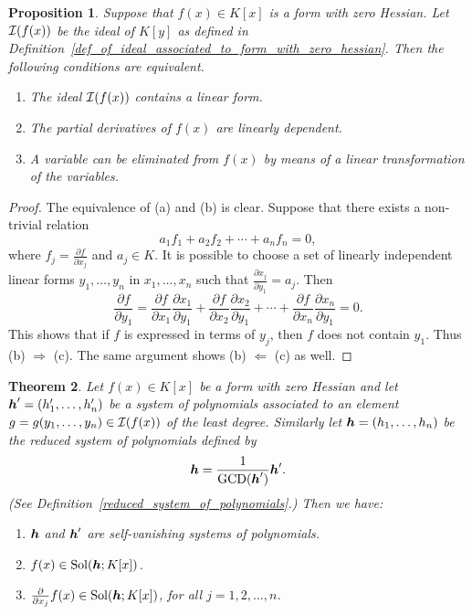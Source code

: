 \documentclass[12pt]{article}
\newtheorem{theorem}{Theorem}[section]
\newtheorem{proposition}[theorem]{Proposition}
\theoremstyle{definition}
\theoremstyle{remark}
\def\cI{{\cal I}}
\def\sol{{\rm Sol}}
\def\boldh{\mbox{\boldmath $h$}}
\def\pa{\partial}
\begin{document}
\begin{proposition} \label{basic_3}   %
Suppose that 
$f(x) \in K[x]$ is a form with zero Hessian. 
Let ${\cal I}(f(x))$ be the ideal of 
$K[y]$ as  defined in Definition~\ref{def_of_ideal_associated_to_form_with_zero_hessian}.  
Then the following conditions are equivalent. 
\begin{enumerate}
\item[{\rm (a)}]
The ideal ${\cal I}(f(x))$ contains a linear form. 
\item[${\rm (b)}$]
The partial derivatives of $f(x)$ are linearly dependent. 
\item[{\rm (c)}]
A variable can be eliminated from  $f(x)$ by means of a linear transformation of the variables. 
\end{enumerate}
\end{proposition}    

\begin{proof}
The equivalence of (a) and (b) is clear.  Suppose that there exists a non-trivial relation 
\[a_1 f_1 + a_2 f_2 + \cdots + a_n f_n =0,\]
where $f_j= \frac{\pa f}{\pa x_j}$ and $a_j \in K$.   
It is possible to choose a set of linearly  independent linear forms  
$y_1, \ldots, y_n$  in $x_1, \ldots, x_n$ such that 
$\frac{\pa x_j}{\pa y_1}=a_j$.  
Then 
\[\frac{\pa f}{\pa y_1}= \frac{\pa f}{\pa x_1}\frac{\pa x_1}{\pa y_1}+ \frac{\pa f}{\pa x_2}\frac{\pa x_2}{\pa y_1}+ 
\cdots + \frac{\pa f}{\pa x_n}\frac{\pa x_n}{\pa y_1}=0.\] 
This shows that if $f$ is expressed in terms of $y_j$, then $f$ does not contain $y_1$.  Thus (b) $\Rightarrow$ (c). 
The same argument shows (b) $\Leftarrow$ (c) as well.   
\end{proof}


\begin{theorem}  \label{basic_fact_due_to_gordan_noether}
Let $f(x) \in K[x]$ be  a form with zero Hessian and let  
$\boldh'=(h'_1, \ldots, h'_n)$ be a system of 
polynomials associated to an element $g=g(y_1, \ldots, y_n) \in \cI(f(x))$ of the least degree.  
Similarly let $\boldh=(h_1, \ldots, h_n)$ be the reduced system of polynomials defined by 
\[\boldh= \frac{1}{{\rm  GCD}(\boldh ')}\boldh'.\]
(See Definition~\ref{reduced_system_of_polynomials}.)
Then we have:
\begin{enumerate}
\item[$(${\rm a}$)$]
$\boldh$ and $\boldh '$ are self-vanishing systems of polynomials.
\item[$(${\rm b}$)$]
$f(x) \in \sol(\boldh; K[x])$. 
\item[$(${\rm c}$)$]
$\frac{\pa }{\pa x_j} f(x) \in \sol(\boldh; K[x])$, for all $j=1,2, \ldots, n$.
\end{enumerate}
\end{theorem}
\end{document}
